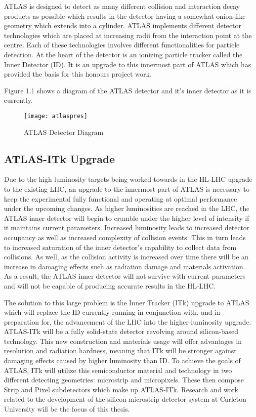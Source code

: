 \documentclass[letterpaper, 11pt]{report}
\begin{document}
ATLAS is designed to detect as many different collision and interaction decay products as possible which results in the detector having a somewhat onion-like geometry which extends into a cylinder.  ATLAS implements different detector technologies which are placed at increasing radii from the interaction point at the centre.  Each of these technologies involves different functionalities for particle detection.  At the heart of the detector is an ionizing particle tracker called the Inner Detector (ID).  It is an upgrade to this innermost part of ATLAS which has provided the basis for this honours project work.

Figure 1.1 shows a diagram of the ATLAS detector and it's inner detector as it is currently.

\begin{figure}[h]
\centering
\texttt{[image: atlaspres]}
\caption{ATLAS Detector Diagram}
\end{figure}

\subsection{ATLAS-ITk Upgrade}

Due to the high luminosity targets being worked towards in the HL-LHC upgrade to the existing LHC, an upgrade to the innermost part of ATLAS is necessary to keep the experimental fully functional and operating at optimal performance under the upcoming changes.  As higher luminosities are reached in the LHC, the ATLAS inner detector will begin to crumble under the higher level of intensity if it maintains current parameters.  Increased luminosity leads to increased detector occupancy as well as increased complexity of collision events.  This in turn leads to increased saturation of the inner detector's capability to collect data from collisions.  As well, as the collision activity is increased over time there will be an increase in damaging effects such as radiation damage and materials activation.  As a result, the ATLAS inner detector will not survive with current parameters and will not be capable of producing accurate results in the HL-LHC.

The solution to this large problem is the Inner Tracker (ITk) upgrade to ATLAS which will replace the ID currently running in conjunction with, and in preparation for, the advancement of the LHC into the higher-luminosity upgrade.  ATLAS-ITk will be a fully solid-state detector revolving around silicon-based technology.  This new construction and materials usage will offer advantages in resolution and radiation hardness, meaning that ITk will be stronger against damaging effects caused by higher luminosity than ID.  To achieve the goals of ATLAS, ITk will utilize this semiconductor material and technology in two different detecting geometries: microstrip and micropixels.  These then compose Strip and Pixel subdetectors which make up ATLAS-ITk.  Research and work related to the development of the silicon microstrip detector system at Carleton University will be the focus of this thesis.
\end{document}
